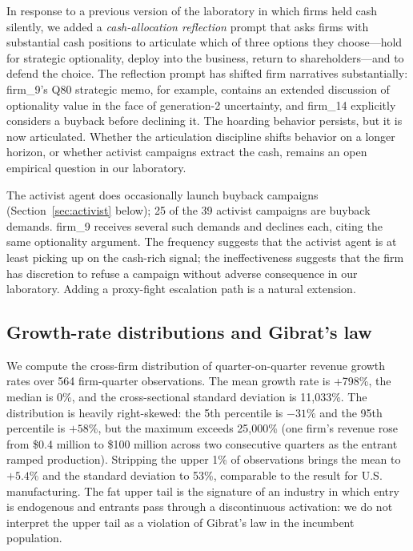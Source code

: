 \documentclass[11pt]{article}
\begin{document}
In response to a previous version of the laboratory in which firms held
cash silently, we added a \emph{cash-allocation reflection} prompt that
asks firms with substantial cash positions to articulate which of three
options they choose---hold for strategic optionality, deploy into the
business, return to shareholders---and to defend the choice. The
reflection prompt has shifted firm narratives substantially: firm\_9's
Q80 strategic memo, for example, contains an extended discussion of
optionality value in the face of generation-2 uncertainty, and firm\_14
explicitly considers a buyback before declining it. The hoarding
behavior persists, but it is now articulated. Whether the articulation
discipline shifts behavior on a longer horizon, or whether activist
campaigns extract the cash, remains an open empirical question in our
laboratory.

The activist agent does occasionally launch buyback campaigns
(Section~\ref{sec:activist} below); 25 of the 39 activist campaigns are
buyback demands. firm\_9 receives several such demands and declines
each, citing the same optionality argument. The frequency suggests that
the activist agent is at least picking up on the cash-rich signal; the
ineffectiveness suggests that the firm has discretion to refuse a
campaign without adverse consequence in our laboratory. Adding a
proxy-fight escalation path is a natural extension.

\subsection{Growth-rate distributions and Gibrat's law}\label{sec:growth}

We compute the cross-firm distribution of quarter-on-quarter revenue
growth rates over 564 firm-quarter observations. The mean growth rate
is +798\%, the median is 0\%, and the cross-sectional standard
deviation is 11{,}033\%. The distribution is heavily right-skewed: the
5th percentile is $-31\%$ and the 95th percentile is $+58\%$, but the
maximum exceeds 25{,}000\% (one firm's revenue rose from \$0.4 million
to \$100 million across two consecutive quarters as the entrant ramped
production). Stripping the upper 1\% of observations brings the mean
to $+5.4\%$ and the standard deviation to 53\%, comparable to the
\citet{stanley1996scaling} result for U.S. manufacturing. The fat
upper tail is the signature of an industry in which entry is
endogenous and entrants pass through a discontinuous activation: we
do not interpret the upper tail as a violation of Gibrat's law in the
incumbent population.
\end{document}

